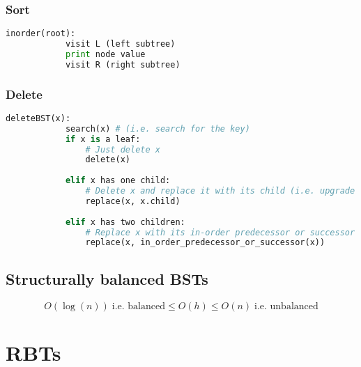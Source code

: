 \documentclass{article}
\begin{document}
\subsubsection{Sort}
\begin{algo}
    \begin{lstlisting}[language=Python]
        inorder(root):
            visit L (left subtree)
            print node value
            visit R (right subtree)
    \end{lstlisting}
\end{algo}

\subsubsection{Delete}
\begin{algo}
    \begin{lstlisting}[language=Python]
        deleteBST(x):
            search(x) # (i.e. search for the key)
            if x is a leaf:
                # Just delete x
                delete(x)
            
            elif x has one child:
                # Delete x and replace it with its child (i.e. upgrade child)
                replace(x, x.child)
            
            elif x has two children:
                # Replace x with its in-order predecessor or successor
                replace(x, in_order_predecessor_or_successor(x))
    \end{lstlisting}
\end{algo}

\subsection{Structurally balanced BSTs}
\begin{definition}
    \begin{equation}
        O(\log (n)) \; \text{i.e. balanced} \leq O(h) \leq O(n) \; \text{i.e. unbalanced}
    \end{equation}
\end{definition}

\newpage 

\section{RBTs}
\begin{summary}
    
\end{summary}
\end{document}
